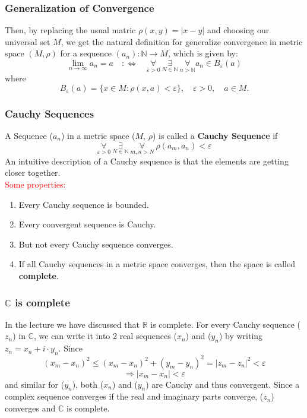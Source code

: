 \documentclass{beamer}
\begin{document}
\begin{frame}
    \frametitle{Generalization of Convergence}
Then, by replacing the usual matric $\rho(x,y)=|x-y|$ and choosing our universal set $M$, we get the natural definition for
generalize convergence in metric space $(M,\rho)$ for a sequence $(a_n):\mathbb{N}\rightarrow M$, which is given by:
\begin{equation*}
    \lim_{n\rightarrow \infty}a_n=a\quad :\Leftrightarrow \quad \underset{\varepsilon>0}{\forall}\ \underset{N\in \mathbb{N}}{\exists}\ \underset{n>\mathbb{N}}{\forall} a_n\in B_\varepsilon(a)
\end{equation*}
where
\begin{equation*}
    B_\varepsilon(a)=\{ x\in M:\rho(x,a)<\varepsilon\},\quad \varepsilon>0,\quad a\in M.
\end{equation*}
\end{frame}
\begin{frame}
    \frametitle{Cauchy Sequences}
    A Sequence ($a_n$) in a metric space ($M$, $\rho$) is called a 
    \textbf{Cauchy Sequence} if
    $$\underset{\varepsilon>0}{\forall} ~\underset{N \in \mathbb{N}}{\exists}~\underset{m,n>N}{\forall} ~\rho(a_m,a_n)<\varepsilon$$ 
    An intuitive description of a Cauchy sequence is that the elements are
    getting closer together.\\
    \vspace{1em}
    \textcolor{red}{Some properties:}
    \begin{enumerate}
        \item Every Cauchy sequence is bounded.
        \item Every convergent sequence is Cauchy.
        \item But not every Cauchy sequence converges.
        \item If all Cauchy sequences in a metric space converges, 
        then the space is called \textbf{complete}.        
    \end{enumerate}
\end{frame}
\begin{frame}
    \frametitle{$\mathbb{C}$ is complete}
    In the lecture we have discussed that $\mathbb{R}$ is complete.
    For every Cauchy sequence ($z_n$) in $\mathbb{C}$, 
    we can write it into 2 real sequences ($x_n$) and ($y_n$)
     by writing $z_n = x_n + i \cdot  y_n$. Since 
    $$(x_m-x_n)^2\leq (x_m-x_n)^2+(y_m-y_n)^2=|z_m-z_n|^2<\varepsilon$$
    $$\Rightarrow |x_m-x_n|< \varepsilon$$
    and similar for ($y_n$), both ($x_n$) and ($y_n$) are Cauchy and thus convergent.
    Since a complex sequence converges if the real and imaginary parts
    converge, ($z_n$) converges and $\mathbb{C}$ is complete.

\end{frame}
\end{document}

